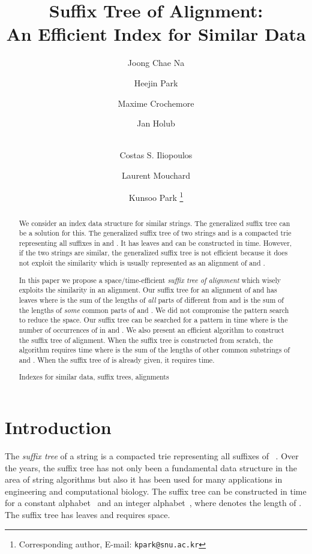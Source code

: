 \documentclass{llncs}
\title{Suffix Tree of Alignment:\\An Efficient Index for Similar Data}
\author{
    Joong Chae Na\inst{1}
\and
     Heejin Park\inst{2}
\and
     Maxime Crochemore\inst{3}
\and
     Jan Holub\inst{4}
\and \\
     Costas S. Iliopoulos\inst{3}
\and
     Laurent Mouchard\inst{5}
\and
     Kunsoo Park\inst{6}
\thanks{Corresponding author, E-mail: {\tt kpark@snu.ac.kr}}
}
\institute{
Sejong University,
Korea
\and
Hanyang University,
Korea
\and
King's College London,
UK
\and
Czech Technical University in Prague,
Czech Republic
\and
University of Rouen,
France
\and
Seoul National University,
Korea
}
\newcommand{\partitle}[1]{}                        \newcommand{\commentout}[1]{}
\newcommand{\keywords}[1]{\par\addvspace\baselineskip
\noindent\keywordname\enspace\ignorespaces#1}
\begin{document}
\maketitle



\begin{abstract}
We consider an index data structure for similar strings.
The generalized suffix tree can be a solution for this.
The generalized suffix tree of two strings  and 
 is a compacted trie representing all suffixes in  and .
It has  leaves and can be constructed in  time.
However, if the two strings are similar,
 the generalized suffix tree is not efficient
 because it does not exploit the similarity
 which is usually represented as an alignment of  and .

In this paper we propose a space/time-efficient
{\em suffix tree of alignment}
which wisely exploits the similarity in an alignment.
Our suffix tree for an alignment of  and  has
 leaves
where  is the sum of the lengths of {\em all} parts of  different from 
and  is the sum of the lengths of {\em some} common parts of  and .
We did not compromise the pattern search
to reduce the space.
Our suffix tree can be searched for a pattern 
in  time
where  is the number of occurrences of  in  and .
We also present an efficient algorithm
to construct the suffix tree of alignment.
When the suffix tree is constructed from scratch,
the algorithm requires  time
where  is the sum of the lengths of other common
substrings of  and .
When the suffix tree of  is already given,
it requires  time.
\keywords{Indexes for similar data, suffix trees, alignments}
\end{abstract}



\pagestyle{headings}  
\setcounter{page}{1}



\section{Introduction}




\partitle{Suffix trees}

The {\em suffix tree} of a string 
 is a compacted trie representing all suffixes of ~\cite{McCreight:76,Weiner:73}.
Over the years, the suffix tree
 has not only been a fundamental data structure in the area of string algorithms
 but also it has been used for many applications in engineering and computational biology.
The suffix tree can be constructed in  time
 for a constant alphabet~\cite{McCreight:76,Ukkonen:95}
 and an integer alphabet~\cite{Farach-Colton&Ferragina:00},
 where  denotes the length of .
The suffix tree has  leaves and requires  space.
\end{document}
